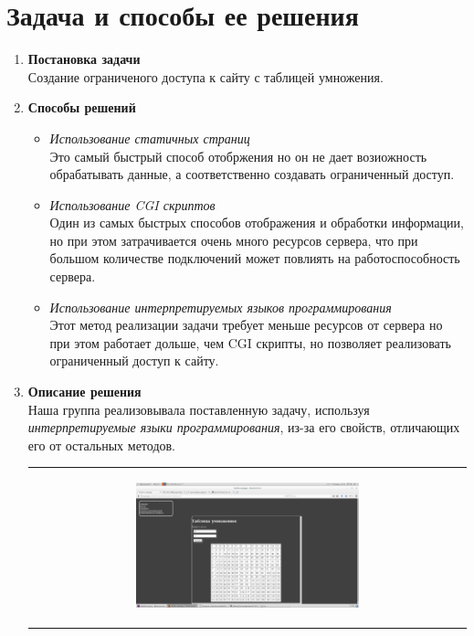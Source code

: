 \documentclass[a4paper]{article}
\begin{document}
\section{Задача и способы ее решения}
\begin{enumerate}

\item \textbf{Постановка задачи}\\
Создание ограниченого доступа к сайту с таблицей умножения.
\item \textbf{Способы решений}
\begin{itemize} 
\item \textit{Использование статичных страниц}\\
Это самый быстрый способ отобржения но он не дает возиожность обрабатывать данные, а соответственно создавать ограниченный доступ.
\item \textit{Использование CGI скриптов}\\
Один из самых быстрых способов отображения и обработки информации, но при этом затрачивается очень много ресурсов сервера, что при большом количестве подключений может повлиять на работоспособность сервера.
\item \textit{Использование интерпретируемых языков программирования}\\
Этот метод реализации задачи требует меньше ресурсов от сервера но при этом работает дольше, чем CGI скрипты, но позволяет реализовать ограниченный доступ к сайту.
\end{itemize} 
\item \textbf{Описание решения}\\
Наша группа реализовывала поставленную задачу, используя \textsl{интерпретируемые языки программирования}, из-за его свойств, отличающих его от остальных методов.\\
\begin{tabular}{c}
\begin{minipage}{\textwidth}
\begin{figure}[H]
\includegraphics[width=0.63\textwidth]{first_page}

\end{figure}
\end{minipage}
\end{tabular}
\end{enumerate}
\end{document}
